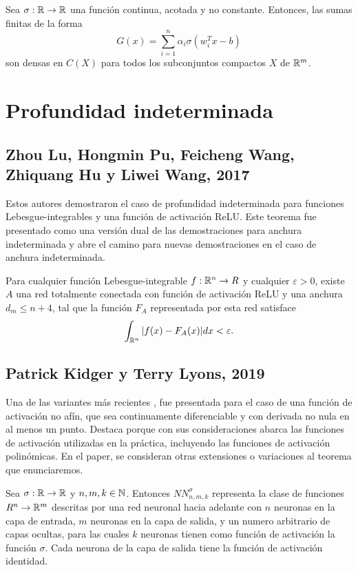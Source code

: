 \begin{teorema}
Sea $\sigma: \mathbb{R} \to \mathbb{R}$ una función continua, acotada y no constante. Entonces, las sumas finitas de la forma $$G(x)=\sum_{i=1}^n \alpha_i \sigma(w_i^Tx-b)$$ son densas en $C(X)$ para todos los subconjuntos compactos $X$ de $\mathbb{R}^m$.
\end{teorema}

\section{Profundidad indeterminada}

\subsection{Zhou Lu, Hongmin Pu, Feicheng Wang, Zhiquang Hu y Liwei Wang, 2017}
Estos autores demostraron \cite{2017arXiv170902540L} el caso de profundidad indeterminada para funciones Lebesgue-integrables y una función de activación ReLU. Este teorema fue presentado como una versión dual de las demostraciones para anchura indeterminada y abre el camino para nuevas demostraciones en el caso de anchura indeterminada.

\begin{teorema}
Para cualquier función Lebesgue-integrable $f:\mathbb{R}^n\to R$ y cualquier $\varepsilon>0$, existe $A$ una red totalmente conectada con función de activación ReLU y una anchura $d_m\leq n+4$, tal que la función $F_A$ representada por esta red satisface $$\int_{\mathbb{R}^n}|f(x)-F_A(x)|dx<\varepsilon.$$
\end{teorema}

\subsection{Patrick Kidger y Terry Lyons, 2019}
Una de las variantes más recientes \cite{2019arXiv190508539K}, fue presentada para el caso de una función de activación no afín, que sea continuamente diferenciable y con derivada no nula en al menos un punto. Destaca porque con sus consideraciones abarca las funciones de activación utilizadas en la práctica, incluyendo las funciones de activación polinómicas. En el paper, se consideran otras extensiones o variaciones al teorema que enunciaremos.\\

\begin{definicion}
Sea $\sigma:\mathbb{R}\to\mathbb{R}$ y $n,m,k\in\mathbb{N}$. Entonces $NN_{n,m,k}^\sigma$ representa la clase de funciones $R^n\to \mathbb{R}^m$ descritas por una red neuronal hacia adelante con $n$ neuronas en la capa de entrada, $m$ neuronas en la capa de salida, y un numero arbitrario de capas ocultas, para las cuales $k$ neuronas tienen como función de activación la función $\sigma$. Cada neurona de la capa de salida tiene la función de activación identidad.
\end{definicion}

